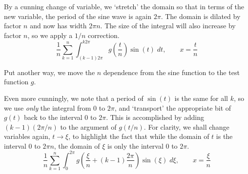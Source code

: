\documentclass[a4paper]{report}
\begin{document}
By a cunning change of variable, we `stretch' the domain so that in terms of the new variable, the period of the sine wave is again $2\pi$.  The domain is dilated by factor $n$ and now has width $2\pi n$.  The size of the integral will also increase by factor $n$, so we apply a $1/n$ correction.
\begin{equation}
\frac{1}{n} \sum_{k=1}^n  \int_{(k-1) 2\pi}^{k 2\pi} g \left(\frac{t}{n} \right) \sin(t) \;dt 
, \qquad x = \frac{t}{n}
\end{equation}

Put another way, we move the $n$ dependence from the sine function to the test function $g$.

\begin{center}
\end{center}

Even more cunningly, we note that a period of $\sin(t)$ is the same for all $k$, so we use \emph{only} the integral from $0$ to $2\pi$, and `transport' the appropriate bit of $g(t)$ back to the interval $0$ to $2\pi$.  This is accomplished by adding $(k-1) (2\pi /n)$ to the argument of $g(t/n)$.  For clarity, we shall change variables again, $t \to \xi$, to highlight the fact that while the domain of $t$ is the interval $0$ to $2\pi n$, the domain of $\xi$ is only the interval $0$ to $2\pi$.
\begin{equation}
\frac{1}{n} \sum_{k=1}^n  \int_0^{2\pi} g\left(\frac{\xi}{n} + (k-1) \frac{2\pi}{n} \right) \sin(\xi) \;d\xi , \qquad x = \frac{\xi}{n}
\end{equation}
\end{document}
